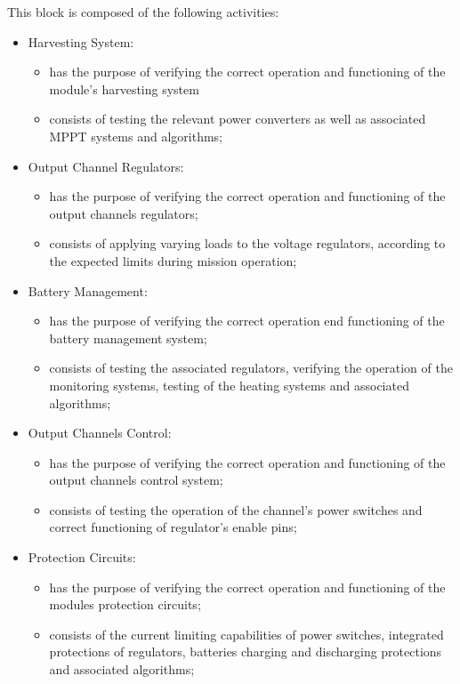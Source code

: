 This block is composed of the following activities:

\begin{itemize}
    \item Harvesting System:
    \begin{itemize}
        \item has the purpose of verifying the correct operation and functioning of the module's harvesting system
        \item consists of testing the relevant power converters as well as associated MPPT systems and algorithms;
    \end{itemize}

    \item Output Channel Regulators:
    \begin{itemize}
        \item has the purpose of verifying the correct operation and functioning of the output channels regulators;
        \item consists of applying varying loads to the voltage regulators, according to the expected limits during mission operation;
    \end{itemize}

    \item Battery Management:
    \begin{itemize}
        \item has the purpose of verifying the correct operation end functioning of the battery management system;
        \item consists of testing the associated regulators, verifying the operation of the monitoring systems, testing of the heating systems and associated algorithms;
    \end{itemize}

    \item Output Channels Control:
    \begin{itemize}
        \item has the purpose of verifying the correct operation and functioning of the output channels control system;
        \item consists of testing the operation of the channel's power switches and correct functioning of regulator's enable pins;
    \end{itemize}

    \item Protection Circuits:
    \begin{itemize}
        \item has the purpose of verifying the correct operation and functioning of the modules protection circuits;
        \item consists of the current limiting capabilities of power switches, integrated protections of regulators, batteries charging and discharging protections and associated algorithms;
    \end{itemize}


\end{itemize}
